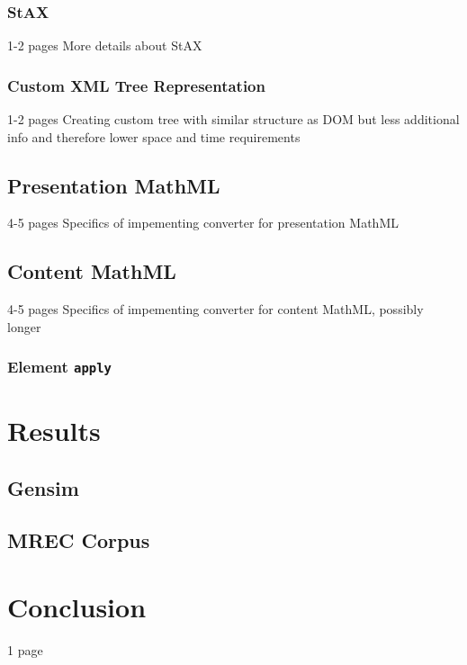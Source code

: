 \documentclass[11pt,oneside,final]{fithesis2}
\begin{document}
\subsection{StAX}
1-2 pages More details about StAX
\subsection{Custom XML Tree Representation}
1-2 pages Creating custom tree with similar structure as DOM but less additional info and therefore lower space and time requirements

\section{Presentation MathML}
4-5 pages Specifics of impementing converter for presentation MathML
\section{Content MathML}
4-5 pages Specifics of impementing converter for content MathML, possibly longer
\subsection{Element \texttt{apply}}

\chapter{Results}
\section{Gensim}
\section{MREC Corpus}

\chapter{Conclusion}
1 page
\end{document}
